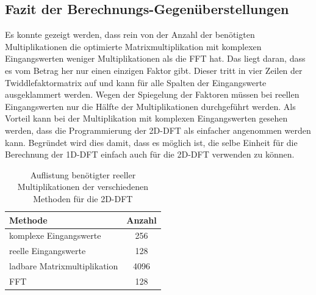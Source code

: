 \subsection{Fazit der Berechnungs-Gegenüberstellungen}
Es konnte gezeigt werden, dass rein von der Anzahl der benötigten Multiplikationen die optimierte Matrixmultiplikation mit komplexen Eingangswerten weniger Multiplikationen
als die FFT hat. Das liegt daran, dass es vom Betrag her nur einen einzigen Faktor gibt. Dieser tritt in vier Zeilen der Twiddlefaktormatrix auf und kann für alle Spalten
der Eingangswerte ausgeklammert werden. Wegen der Spiegelung der Faktoren müssen bei reellen Eingangswerten nur die Hälfte der Multiplikationen durchgeführt werden.
Als Vorteil kann bei der Multiplikation mit komplexen Eingangswerten gesehen werden, dass die Programmierung der 2D-DFT als einfacher angenommen werden kann.
Begründet wird dies damit, dass es möglich ist, die selbe Einheit für die Berechnung der 1D-DFT einfach auch für die 2D-DFT verwenden zu können.


\begin{table}[ht!]
\centering
\caption{Auflistung benötigter reeller Multiplikationen der verschiedenen Methoden für die 2D-DFT}
 \begin{tabular}{lc}
  \hline
  Methode  & Anzahl\\
  \hline
  komplexe Eingangswerte & 256\\
  reelle Eingangswerte   & 128\\
  ladbare Matrixmultiplikation & 4096\\
  FFT   & 128\\
  \hline
 \end{tabular}
 \label{tab:AuflistungMultiplikationen}
\end{table}

